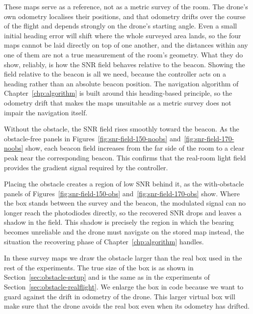These maps serve as a reference, not as a metric survey of the room. The drone's own odometry localises their positions, and that odometry drifts over the course of the flight and depends strongly on the drone's starting angle. Even a small initial heading error will shift where the whole surveyed area lands, so the four maps cannot be laid directly on top of one another, and the distances within any one of them are not a true measurement of the room's geometry. What they do show, reliably, is how the SNR field behaves relative to the beacon. Showing the field relative to the beacon is all we need, because the controller acts on a heading rather than an absolute beacon position. The navigation algorithm of Chapter~\ref{chp:algorithm} is built around this heading-based principle, so the odometry drift that makes the maps unsuitable as a metric survey does not impair the navigation itself.

Without the obstacle, the SNR field rises smoothly toward the beacon. As the obstacle-free panels in Figures~\ref{fig:snr-field-150-noobs} and~\ref{fig:snr-field-170-noobs} show, each beacon field increases from the far side of the room to a clear peak near the corresponding beacon. This confirms that the real-room light field provides the gradient signal required by the controller.


Placing the obstacle creates a region of low SNR behind it, as the with-obstacle panels of Figures~\ref{fig:snr-field-150-obs} and~\ref{fig:snr-field-170-obs} show. Where the box stands between the survey and the beacon, the modulated signal can no longer reach the photodiodes directly, so the recovered SNR drops and leaves a shadow in the field. This shadow is precisely the region in which the bearing becomes unreliable and the drone must navigate on the stored map instead, the situation the recovering phase of Chapter~\ref{chp:algorithm} handles.

In these survey maps we draw the obstacle larger than the real box used in the rest of the experiments. The true size of the box is as shown in Section~\ref{sec:obstacle-setup} and is the same as in the experiments of Section~\ref{sec:obstacle-realflight}. We enlarge the box in code because we want to guard against the drift in odometry of the drone. This larger virtual box will make sure that the drone avoids the real box even when its odometry has drifted.

